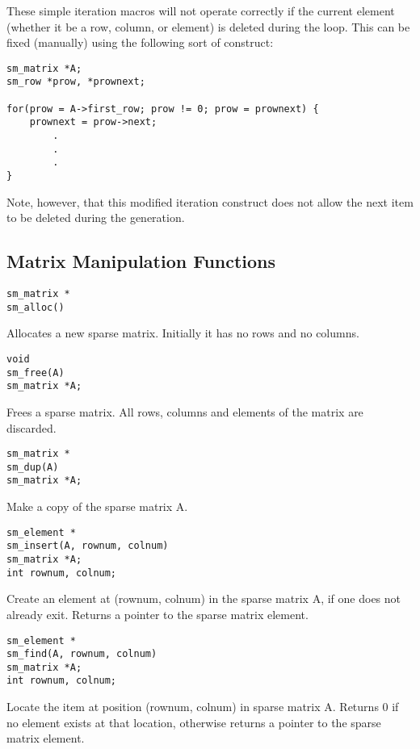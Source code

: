 These simple iteration macros will not operate correctly if the current
element (whether it be a row, column, or element) is deleted during
the loop.  This can be fixed
(manually) using the following sort of construct:

\begin{verbatim}
sm_matrix *A;
sm_row *prow, *prownext;

for(prow = A->first_row; prow != 0; prow = prownext) {
    prownext = prow->next;
        .
        .
        .
}
\end{verbatim}

Note, however, that this modified
iteration construct does not allow the
next item to be deleted during the generation.

\subsection{Matrix Manipulation Functions}

\begin{verbatim}
sm_matrix *
sm_alloc()
\end{verbatim}

        Allocates a new sparse matrix.  Initially it has no rows and no columns.


\begin{verbatim}
void
sm_free(A)
sm_matrix *A;
\end{verbatim}

        Frees a sparse matrix.  All rows, columns and elements of the matrix
        are discarded.


\begin{verbatim}
sm_matrix *
sm_dup(A)
sm_matrix *A;
\end{verbatim}

        Make a copy of the sparse matrix A.


\begin{verbatim}
sm_element *
sm_insert(A, rownum, colnum)
sm_matrix *A;
int rownum, colnum;
\end{verbatim}

        Create an element at (rownum, colnum) in the sparse matrix A, if one
        does not already exit.  Returns a pointer to the sparse matrix element.


\begin{verbatim}
sm_element *
sm_find(A, rownum, colnum)
sm_matrix *A;
int rownum, colnum;
\end{verbatim}

        Locate the item at position (rownum, colnum) in sparse matrix A.
        Returns 0 if no element exists at that location, otherwise returns a
        pointer to the sparse matrix element.


